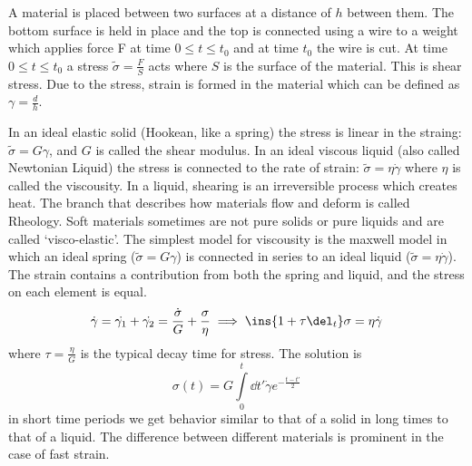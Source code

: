 
A material is placed between two surfaces at a distance of \(h\) between them. The bottom surface is held in place and the top is connected using a wire to a weight which applies force F at time \(0 \leq t \leq t_0\) and at time \(t_0\) the wire is cut. At time \(0 \leq t \leq t_0\) a stress \(\tilde{\sigma} = \frac{F}{S}\) acts where \(S\) is the surface of the material. This is shear stress. Due to the stress, strain is formed in the material which can be defined as \(\gamma = \frac{d}{h}\).


In an ideal elastic solid (Hookean, like a spring) the stress is linear in the straing: \(\tilde{\sigma} = G\gamma\), and \(G\) is called the shear modulus. In an ideal viscous liquid (also called Newtonian Liquid) the stress is connected to the rate of strain: \(\tilde{\sigma} = \eta\dot{\gamma}\) where \(\eta \) is called the viscousity. In a liquid, shearing is an irreversible process which creates heat. The branch that describes how materials flow and deform is called Rheology. Soft materials sometimes are not pure solids or pure liquids and are called `visco-elastic'.  The simplest model for viscousity is the maxwell model in which an ideal spring (\(\tilde{\sigma}=G\gamma \)) is connected in series to an ideal liquid (\(\tilde{\sigma} = \eta\dot{\gamma}\)). The strain contains a contribution from both the spring and liquid, and the stress on each element is equal.
\begin{equation}
    \dot{\gamma} = \dot{\gamma_1}+\dot{\gamma_2} = \frac{\dot{\sigma}}{G}+\frac{\sigma}{\eta} \implies \ins{1 + \tau\del_t}\sigma = \eta\dot{\gamma}
\end{equation}
where \(\tau=\frac{\eta}{G}\) is the typical decay time for stress. The solution is
\begin{equation}
    \sigma(t) = G \int\limits_0^t\dd t' \dot{\gamma} e^{-\frac{t-t'}{2}}
\end{equation}
in short time periods we get behavior similar to that of a solid in long times to that of a liquid. The difference between different materials is prominent in the case of fast strain.


